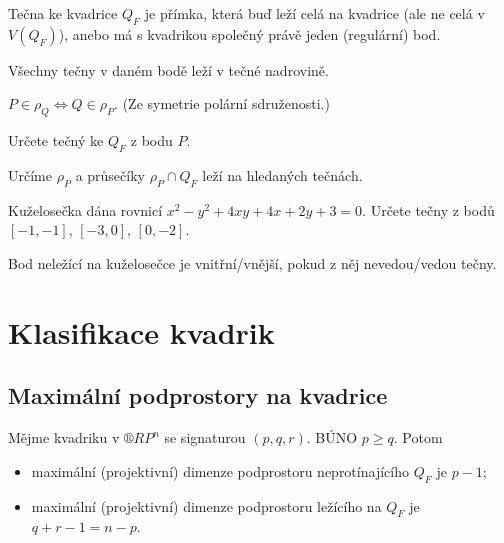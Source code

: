 \documentclass[12pt]{article}					%
\begin{document}
\begin{definice}[Tečna]
	Tečna ke kvadrice $Q_F$ je přímka, která buď leží celá na kvadrice (ale ne celá v $V(Q_F)$), anebo má s kvadrikou společný právě jeden (regulární) bod.
\end{definice}

\begin{poznamka}
	Všechny tečny v daném bodě leží v tečné nadrovině.
\end{poznamka}

\begin{poznamka}[Platí]
	$P \in ρ_Q \Leftrightarrow Q \in ρ_P$. (Ze symetrie polární sdruženosti.)
\end{poznamka}


\begin{priklad}
	Určete tečný ke $Q_F$ z bodu $P$.

	\begin{reseni}
		Určíme $ρ_P$ a průsečíky $ρ_P \cap Q_F$ leží na hledaných tečnách.
	\end{reseni}

	Kuželosečka dána rovnicí $x^2 - y^2 + 4xy + 4x + 2y + 3 = 0$. Určete tečny z bodů $[-1, -1]$, $[-3, 0]$, $[0, -2]$.
\end{priklad}

\begin{definice}
	Bod neležící na kuželosečce je vnitřní/vnější, pokud z něj nevedou/vedou tečny.
\end{definice}

\section{Klasifikace kvadrik}
\subsection{Maximální podprostory na kvadrice}

\begin{veta}
	Mějme kvadriku v $®RP^n$ se signaturou $(p, q, r)$. BÚNO $p ≥ q$. Potom
	\begin{itemize}
		\item maximální (projektivní) dimenze podprostoru neprotínajícího $Q_F$ je $p - 1$;
		\item maximální (projektivní) dimenze podprostoru ležícího na $Q_F$ je $q + r - 1 = n - p$.
	\end{itemize}
\end{veta}
\end{document}
